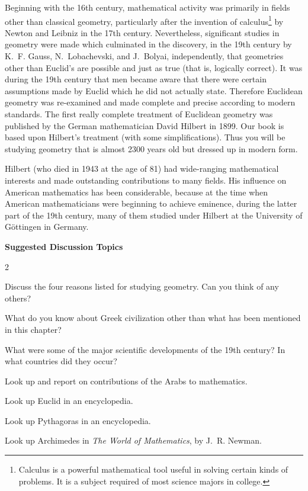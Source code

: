 \documentclass[11pt]{book}
\begin{document}
Beginning with the 16th century, mathematical activity was primarily in fields
other than classical geometry, particularly after the invention of
calculus\footnote{Calculus is a powerful mathematical tool useful in solving
certain kinds of problems. It is a subject required of most science majors in
college.}
by Newton and Leibniz in the 17th century. Nevertheless, significant studies in
geometry were made which culminated in the discovery, in the 19th century by
K.~F. Gauss, N.~Lobachevski, and J.~Bolyai, independently, that geometries other
than Euclid's are possible and just as true (that is, logically correct). It was
during the 19th century that men became aware that there were certain assumptions
made by Euclid which he did not actually state. Therefore Euclidean geometry was
re-examined and made complete and precise according to modern standards. The
first really complete treatment of Euclidean geometry was published by the German
mathematician David Hilbert in 1899. Our book is based upon Hilbert's treatment
(with some simplifications). Thus you will be studying geometry that is almost
2300 years old but dressed up in modern form.

Hilbert (who died in 1943 at the age of 81) had wide-ranging mathematical
interests and made outstanding contributions to many fields. His influence on
American mathematics has been considerable, because at the time when American
mathematicians were beginning to achieve eminence, during the latter part of the
19th century, many of them studied under Hilbert at the University of
G\"ottingen in Germany.

\begin{center}\bfseries Suggested Discussion Topics\end{center}
\nopagebreak
\begin{multicols}{2}
\begin{exlist}
\item Discuss the four reasons listed for studying geometry. Can you think of
      any others?
\item What do you know about Greek civilization other than what has been
      mentioned in this chapter?
\item What were some of the major scientific developments of the 19th century?
      In what countries did they occur?
\item Look up and report on contributions of the Arabs to mathematics.
\item Look up Euclid in an encyclopedia.
\item Look up Pythagoras in an encyclopedia.
\item Look up Archimedes in \emph{The World of Mathematics}, by J.~R. Newman.
\end{exlist}
\end{multicols}
\end{document}
